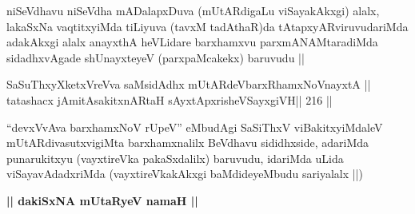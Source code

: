 \begin{artha}
niSeVdhavu niSeVdha mADalapxDuva (mUtARdigaLu viSayakAkxgi) alalx,
lakaSxNa vaqtitxyiMda tiLiyuva (tavxM tadAthaR)da
tAtapxyARviruvudariMda adakAkxgi alalx anayxthA heVLidare barxhamxvu
parxmANAMtaradiMda sidadhxvAgade shUnayxteyeV (parxpaMcakekx) baruvudu ||
\end{artha}

\begin{shl}
SaSuThxyXketxVreVva saMsidAdhx mUtARdeVbarxRhamxNoV\s nayxtA ||
tatashacx jAmitAsakitxnARtaH sAyxtApxrisheVSayxgiVH\hfill || 216 ||
\end{shl}

\begin{artha}
``devxVvAva barxhamxNoV rUpeV'' eMbudAgi SaSiThxV viBakitxyiMdaleV
  mUtARdivasutxvigiMta barxhamxnalilx BeVdhavu sididhxside, adariMda
  punarukitxyu (vayxtireVka pakaSxdalilx) baruvudu, idariMda uLida
  viSayavAdadxriMda (vayxtireVkakAkxgi baMdideyeMbudu sariyalalx ||) 
\end{artha}

\begin{center}
\textbf{|| dakiSxNA mUtaRyeV namaH ||}
\end{center}
